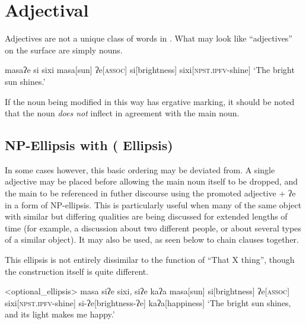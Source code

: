 \chapter{Adjectival}\label{ch:adjectives}
Adjectives are not a unique class of words in \langname . What may look like ``adjectives'' on the surface are simply nouns.

\ex
\begingl
\glpreamble masaʔe si sixi
\endpreamble
\nogloss{\lbrack}
masa[sun]
ʔe[\textsc{assoc}]
si[brightness]
\nogloss{\rbrack}
sixi[\textsc{npst.ipfv}-shine]
\glft `The bright sun shines.'
\endgl
\xe

If the noun being modified in this way has ergative marking, it should be noted that the noun \textit{does not} inflect in agreement with the main noun.



\section[\langword{ʔe} Ellipsis]{NP-Ellipsis with  ( Ellipsis)}

In some cases however, this basic ordering may be deviated from. A single adjective may be placed before  allowing the main noun itself to be dropped, and the main to be referenced in futher discourse using the promoted adjective + ʔe in a form of NP-ellipsis. This is particularly useful when many of the same object with similar but differing qualities are being discussed for extended lengths of time (for example, a discussion about two different people, or about several types of a similar object). It may also be used, as seen below to chain clauses together.

This ellipsis is not entirely dissimilar to the function of ``That X thing'', though the construction itself is quite different.


\ex<optional_ellipsis>
\begingl
\glpreamble masa siʔe sixi, siʔe kaʔa
\endpreamble
\nogloss{\lbrack}
masa[sun]
si[brightness]
ʔe[\textsc{assoc}]
\nogloss{\rbrack}
sixi[\textsc{npst.ipfv}-shine]
si-ʔe[brightness-ʔe]
kaʔa[happiness]
\glft `The bright sun shines, and its light makes me happy.'
\endgl
\xe

